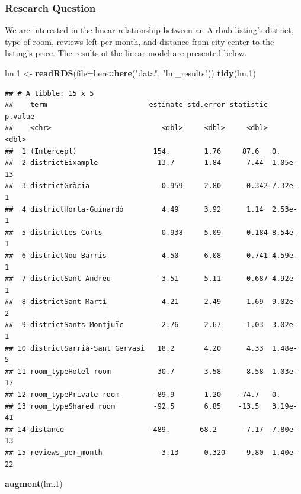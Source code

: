 \documentclass[]{article}
\newenvironment{Shaded}{\begin{snugshade}}{\end{snugshade}}
\newcommand{\DataTypeTok}[1]{\textcolor[rgb]{0.13,0.29,0.53}{#1}}
\newcommand{\FloatTok}[1]{\textcolor[rgb]{0.00,0.00,0.81}{#1}}
\newcommand{\KeywordTok}[1]{\textcolor[rgb]{0.13,0.29,0.53}{\textbf{#1}}}
\newcommand{\NormalTok}[1]{#1}
\newcommand{\OperatorTok}[1]{\textcolor[rgb]{0.81,0.36,0.00}{\textbf{#1}}}
\newcommand{\StringTok}[1]{\textcolor[rgb]{0.31,0.60,0.02}{#1}}
\begin{document}
\hypertarget{research-question}{%
\subsubsection{Research Question}\label{research-question}}

We are interested in the linear relationship between an Airbnb listing's
district, type of room, reviews left per month, and distance from city
center to the listing's price. The results of the linear model are
presented below.

\begin{Shaded}
\begin{Highlighting}[]
\NormalTok{lm}\FloatTok{.1}\NormalTok{ <-}\StringTok{ }\KeywordTok{readRDS}\NormalTok{(}\DataTypeTok{file=}\NormalTok{here}\OperatorTok{::}\KeywordTok{here}\NormalTok{(}\StringTok{"data"}\NormalTok{, }\StringTok{"lm_results"}\NormalTok{))}
\KeywordTok{tidy}\NormalTok{(lm}\FloatTok{.1}\NormalTok{)}
\end{Highlighting}
\end{Shaded}

\begin{verbatim}
## # A tibble: 15 x 5
##    term                        estimate std.error statistic  p.value
##    <chr>                          <dbl>     <dbl>     <dbl>    <dbl>
##  1 (Intercept)                  154.        1.76     87.6   0.      
##  2 districtEixample              13.7       1.84      7.44  1.05e-13
##  3 districtGràcia                -0.959     2.80     -0.342 7.32e- 1
##  4 districtHorta-Guinardó         4.49      3.92      1.14  2.53e- 1
##  5 districtLes Corts              0.938     5.09      0.184 8.54e- 1
##  6 districtNou Barris             4.50      6.08      0.741 4.59e- 1
##  7 districtSant Andreu           -3.51      5.11     -0.687 4.92e- 1
##  8 districtSant Martí             4.21      2.49      1.69  9.02e- 2
##  9 districtSants-Montjuïc        -2.76      2.67     -1.03  3.02e- 1
## 10 districtSarrià-Sant Gervasi   18.2       4.20      4.33  1.48e- 5
## 11 room_typeHotel room           30.7       3.58      8.58  1.03e-17
## 12 room_typePrivate room        -89.9       1.20    -74.7   0.      
## 13 room_typeShared room         -92.5       6.85    -13.5   3.19e-41
## 14 distance                    -489.       68.2      -7.17  7.80e-13
## 15 reviews_per_month             -3.13      0.320    -9.80  1.40e-22
\end{verbatim}

\begin{Shaded}
\begin{Highlighting}[]
\KeywordTok{augment}\NormalTok{(lm}\FloatTok{.1}\NormalTok{)}
\end{Highlighting}
\end{Shaded}
\end{document}
